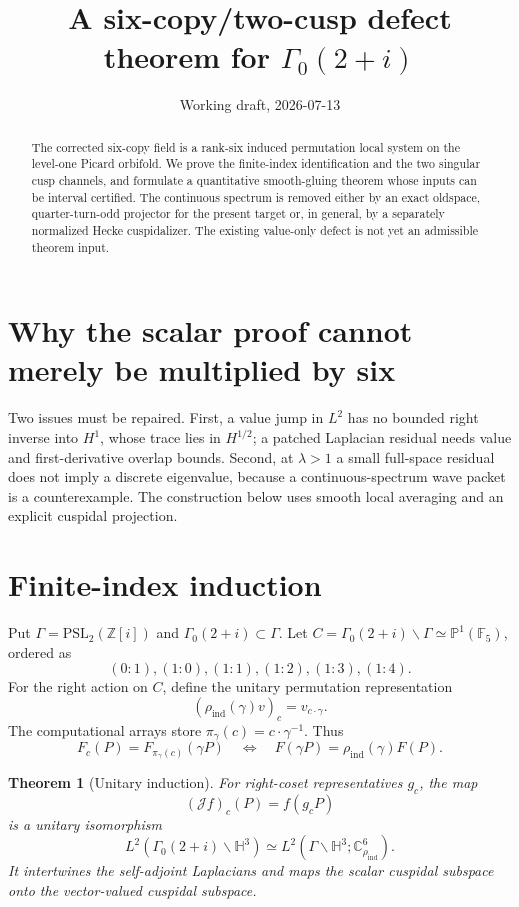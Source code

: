 \documentclass[11pt]{amsart}
\title{A six-copy/two-cusp defect theorem for $\Gamma_0(2+i)$}
\author{}
\date{Working draft, 2026-07-13}
\newtheorem{theorem}{Theorem}[section]
\theoremstyle{definition}
\newcommand{\HH}{\mathbb H^3}
\newcommand{\CC}{\mathbb C}
\newcommand{\ZZ}{\mathbb Z}
\newcommand{\G}{\Gamma}
\newcommand{\Hsub}{\Gamma_0(2+i)}
\newcommand{\rhoind}{\rho_{\mathrm{ind}}}
\begin{document}
\begin{abstract}
The corrected six-copy field is a rank-six induced permutation local
system on the level-one Picard orbifold. We prove the finite-index
identification and the two singular cusp channels, and formulate a
quantitative smooth-gluing theorem whose inputs can be interval certified.
The continuous spectrum is removed either by an exact oldspace,
quarter-turn-odd projector for the present target or, in general, by a
separately normalized Hecke cuspidalizer. The existing value-only defect is
not yet an admissible theorem input.
\end{abstract}
\maketitle

\section{Why the scalar proof cannot merely be multiplied by six}

Two issues must be repaired. First, a value jump in $L^2$ has no bounded
right inverse into $H^1$, whose trace lies in $H^{1/2}$; a patched
Laplacian residual needs value and first-derivative overlap bounds. Second,
at $\lambda>1$ a small full-space residual does not imply a discrete
eigenvalue, because a continuous-spectrum wave packet is a counterexample.
The construction below uses smooth local averaging and an explicit
cuspidal projection.

\section{Finite-index induction}

Put $\G=\mathrm{PSL}_2(\ZZ[i])$ and $\Hsub\subset\G$. Let
$C=\Hsub\backslash\G\simeq\mathbb P^1(\mathbb F_5)$, ordered as
\[
 (0:1),(1:0),(1:1),(1:2),(1:3),(1:4).
\]
For the right action on $C$, define the unitary permutation representation
\begin{equation}\label{eq:rho}
 (\rhoind(\gamma)v)_c=v_{c\cdot\gamma}.
\end{equation}
The computational arrays store
$\pi_\gamma(c)=c\cdot\gamma^{-1}$. Thus
\[
 F_c(P)=F_{\pi_\gamma(c)}(\gamma P)
 \quad\Longleftrightarrow\quad
 F(\gamma P)=\rhoind(\gamma)F(P).
\]

\begin{theorem}[Unitary induction]\label{thm:induction}
For right-coset representatives $g_c$, the map
\[
 (\mathcal Jf)_c(P)=f(g_cP)
\]
is a unitary isomorphism
\[
 L^2(\Hsub\backslash\HH)
 \simeq L^2(\G\backslash\HH;\CC^6_{\rhoind}).
\]
It intertwines the self-adjoint Laplacians and maps the scalar cuspidal
subspace onto the vector-valued cuspidal subspace.
\end{theorem}
\end{document}
